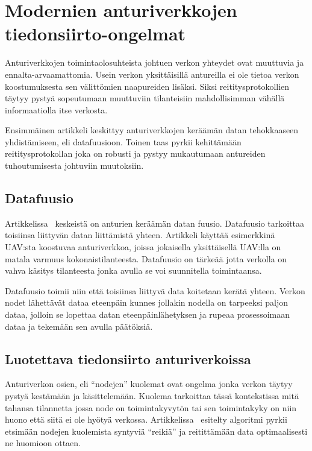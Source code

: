 \section{Modernien anturiverkkojen tiedonsiirto-ongelmat}

Anturiverkkojen toimintaolosuhteista johtuen verkon yhteydet ovat muuttuvia ja
ennalta-arvaamattomia. Usein verkon yksittäisillä antureilla ei ole tietoa
verkon koostumuksesta sen välittömien naapureiden lisäksi. Siksi
reititysprotokollien täytyy pystyä sopeutumaan muuttuviin tilanteisiin
mahdollisimman vähällä informaatiolla itse verkosta.

Ensimmäinen artikkeli keskittyy anturiverkkojen keräämän datan tehokkaaseen
yhdistämiseen, eli datafuusioon. Toinen taas pyrkii kehittämään
reititysprotokollan joka on robusti ja pystyy mukautumaan antureiden
tuhoutumisesta johtuviin muutoksiin.

\subsection{Datafuusio}
Artikkelissa~\cite{Yu2006} keskeistä on anturien keräämän datan fuusio.
Datafuusio tarkoittaa toisiinsa liittyvän datan liittämistä yhteen. Artikkeli
käyttää esimerkkinä UAV:sta koostuvaa anturiverkkoa, joissa jokaisella
yksittäisellä UAV:lla on matala varmuus kokonaistilanteesta. Datafuusio on
tärkeää jotta verkolla on vahva käsitys tilanteesta jonka avulla se voi
suunnitella toimintaansa.

Datafuusio toimii niin että toisiinsa liittyvä data koitetaan kerätä yhteen.
Verkon nodet lähettävät dataa eteenpäin kunnes jollakin nodella on tarpeeksi
paljon dataa, jolloin se lopettaa datan eteenpäinlähetyksen ja rupeaa
prosessoimaan dataa ja tekemään sen avulla päätöksiä.

\subsection{Luotettava tiedonsiirto anturiverkoissa}
Anturiverkon osien, eli ``nodejen'' kuolemat ovat ongelma jonka verkon täytyy
pystyä kestämään ja käsittelemään. Kuolema tarkoittaa tässä kontekstissa mitä
tahansa tilannetta jossa node on toimintakyvytön tai sen toimintakyky on niin
huono että siitä ei ole hyötyä verkossa. Artikkelissa~\cite{Arya2015} esitelty
algoritmi pyrkii etsimään nodejen kuolemista syntyviä ``reikiä'' ja reitittämään
data optimaalisesti ne huomioon ottaen.

